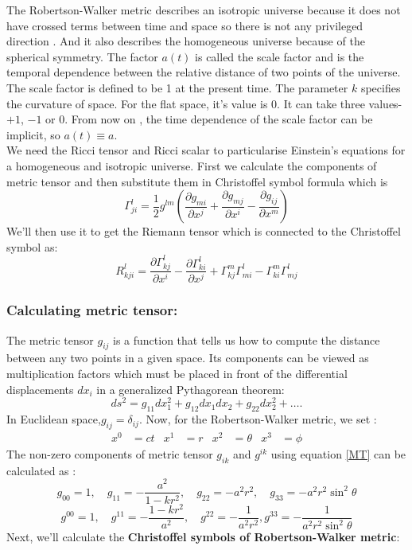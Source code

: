\documentclass[12pt]{article}
\begin{document}
The Robertson-Walker metric describes an isotropic universe because it does not have crossed terms between time and space so there is not any privileged direction \cite{narlikar_hoyle_cosmology}. And it also describes the homogeneous universe because of the spherical symmetry. The factor $a(t)$ is called the scale factor and is the temporal dependence between the relative distance of two points of the universe. The scale factor is defined to be 1 at the present time. The parameter $k$ specifies the curvature of space. For the flat space, it's value is $0$. It can take three values-$+1$, $-1$ or $0$. From now on , the time dependence of the scale factor can be implicit, so $a(t)\equiv a$. \\
We need the Ricci tensor and Ricci scalar to particularise Einstein's equations for a homogeneous and isotropic universe. First we calculate the components of metric tensor and then substitute them in Christoffel symbol formula which is
\begin{equation}
\Gamma_{j i}^{l}=\frac{1}{2} g^{l m}\left(\frac{\partial g_{m i}}{\partial x^{j}}+\frac{\partial g_{m j}}{\partial x^{i}}-\frac{\partial g_{i j}}{\partial x^{m}}\right)
\end{equation}
We'll then use it to get the Riemann tensor which is connected to the Christoffel symbol as:
\begin{equation}
R_{k j i}^{l} = \frac{\partial \Gamma_{k j}^{l}}{\partial x^{i}}-\frac{\partial \Gamma_{k i}^{l}}{\partial x^{j}}+\Gamma_{k j}^{m} \Gamma_{m i}^{l}-\Gamma_{k i}^{m} \Gamma_{m j}^{l}
\end{equation}
\subsubsection{Calculating metric tensor:}
The metric tensor $g_{i j}$ is a function that tells us how to compute the distance between any two points in a given space.  Its components can be viewed as multiplication factors which must be placed in front of the differential displacements $dx_{i}$ in a generalized Pythagorean theorem:
\begin{equation}
d s^{2}=g_{11} d x_{1}^{2}+g_{12} d x_{1} d x_{2}+g_{22} d x_{2}^{2}+\ldots .
\end{equation}
In Euclidean space,$g_{i j}=\delta_{i j}$. Now, for the Robertson-Walker metric, we set :
\begin{align*}
x^{0}&=ct &  x^{1}&=r &  x^{2}&=\theta &  x^{3}&=\phi
\end{align*}
The non-zero components of metric tensor $g_{i k}$ and $g^{i k}$ using equation \eqref{MT} can be calculated as :
\begin{equation}
g_{00}=1, \quad g_{11}=-\frac{a^{2}}{1-k r^{2}}, \quad g_{22}=-a^{2} r^{2}, \quad g_{33}=-a^{2} r^{2} \sin ^{2} \theta
\label{35}
\end{equation}
\begin{equation}
g^{00}=1, \quad g^{11}=-\frac{1-k r^{2}}{a^{2}}, \quad g^{22}=-\frac{1}{a^{2} r^{2}},  g^{33}=-\frac{1}{a^{2} r^{2} \sin ^{2} \theta}
\end{equation}
Next, we'll calculate the \textbf{Christoffel symbols of Robertson-Walker metric}:
\end{document}
